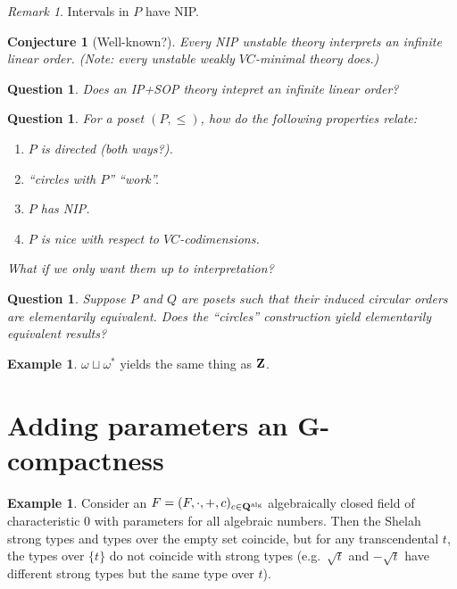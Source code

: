\documentclass[final,a4paper,12pt]{amsart}
\newtheorem{qu}[thm]{Question}
\newtheorem{con}[thm]{Conjecture}
\theoremstyle{remark}
\newtheorem{rem}[thm]{Remark}
\theoremstyle{definition}
\newtheorem{ex}[thm]{Example}
\begin{document}
	\begin{rem}
		Intervals in $P$ have NIP.
	\end{rem}
	
	\begin{con}[Well-known?]
		Every NIP unstable theory interprets an infinite linear order. (Note: every unstable weakly $VC$-minimal theory does.)
	\end{con}
	
	\begin{qu}
		Does an IP+SOP theory intepret an infinite linear order?
	\end{qu}
	
	
	\begin{qu}
		For a poset $(P,\leq)$, how do the following properties relate:
		\begin{enumerate}
			\item
			$P$ is directed (both ways?).
			\item
			``circles with $P$'' ``work''.
			\item
			$P$ has NIP.
			\item
			$P$ is nice with respect to $VC$-codimensions.
		\end{enumerate}
		What if we only want them up to interpretation?
	\end{qu}
	
	\begin{qu}
		Suppose $P$ and $Q$ are posets such that their induced circular orders are elementarily equivalent. Does the ``circles'' construction yield elementarily equivalent results?
	\end{qu}
	
	\begin{ex}
		$\omega\sqcup \omega^*$ yields the same thing as ${\bf Z}$.
	\end{ex}
	
	\section{Adding parameters an G-compactness}
	
	\begin{ex}
		Consider an $F=(F,\cdot,+,c)_{c\in {\bf Q}^{\textrm{alg}}}$ algebraically closed field of characteristic $0$ with parameters for all algebraic numbers. Then the Shelah strong types and types over the empty set coincide, but for any transcendental $t$, the types over $\{t\}$ do not coincide with strong types (e.g.\ $\sqrt{t}$ and $-\sqrt{t}$ have different strong types but the same type over $t$).
	\end{ex}
	
\end{document}
